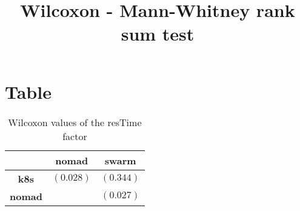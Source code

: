 \documentclass{article}
\title{Wilcoxon - Mann-Whitney rank sum test}
\author{}
\begin{document}
\maketitle
\section{Table}
\begin{table}[!htp]
  \caption{Wilcoxon values of the resTime factor}
  \label{table:resTime}
  \centering
  \begin{scriptsize}
  \begin{tabular}{c|cc}
      & \textbf{nomad} & \textbf{swarm} \\\hline
      \textbf{k8s} & $(0.028) $ & $ (0.344)$ \\
      \textbf{nomad} & $ $ & $ (0.027)$ \\
  \end{tabular}
  \end{scriptsize}
\end{table}
\end{document}
